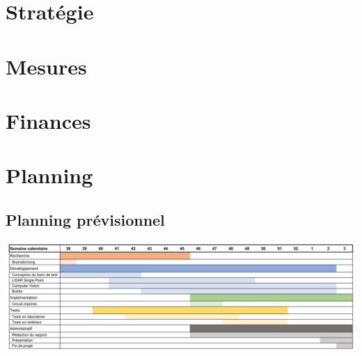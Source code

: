 \documentclass[11pt,titlepage]{report}
\begin{document}
\chapter{Stratégie}


\chapter{Mesures}


\chapter{Finances}



%

%

%

%

%

\appendix

\chapter{Planning}
\section{Planning prévisionnel}
\includegraphics[angle=90, height=0.75\textheight]{Images/business/planning/prevu.PNG}
\end{document}

